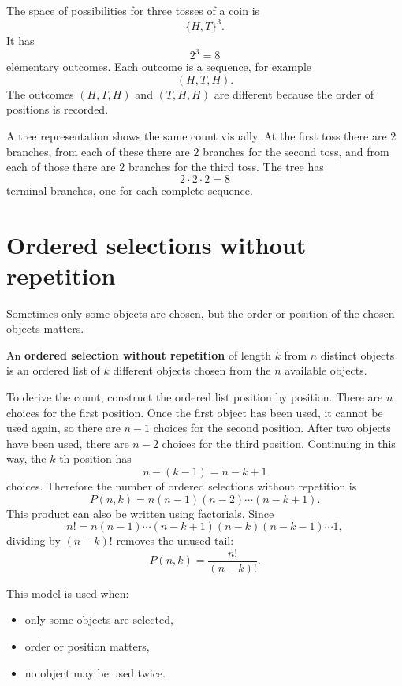\begin{examplebox}
The space of possibilities for three tosses of a coin is
\[
\{H,T\}^3.
\]
It has
\[
2^3=8
\]
elementary outcomes. Each outcome is a sequence, for example
\[
(H,T,H).
\]
The outcomes \((H,T,H)\) and \((T,H,H)\) are different because the order of positions is recorded.

A tree representation shows the same count visually. At the first toss there are \(2\) branches, from each of these there are \(2\) branches for the second toss, and from each of those there are \(2\) branches for the third toss. The tree has
\[
2\cdot 2\cdot 2=8
\]
terminal branches, one for each complete sequence.
\end{examplebox}

\section{Ordered selections without repetition}

Sometimes only some objects are chosen, but the order or position of the chosen objects matters.

\begin{definitionbox}
An \textbf{ordered selection without repetition} of length \(k\) from \(n\) distinct objects is an ordered list of \(k\) different objects chosen from the \(n\) available objects.
\end{definitionbox}

To derive the count, construct the ordered list position by position. There are \(n\) choices for the first position. Once the first object has been used, it cannot be used again, so there are \(n-1\) choices for the second position. After two objects have been used, there are \(n-2\) choices for the third position. Continuing in this way, the \(k\)-th position has
\[
n-(k-1)=n-k+1
\]
choices.
Therefore the number of ordered selections without repetition is
\[
P(n,k)=n(n-1)(n-2)\cdots(n-k+1).
\]
This product can also be written using factorials. Since
\[
n!=n(n-1)\cdots(n-k+1)(n-k)(n-k-1)\cdots 1,
\]
dividing by \((n-k)!\) removes the unused tail:
\[
P(n,k)=\frac{n!}{(n-k)!}.
\]

This model is used when:
\begin{itemize}
    \item only some objects are selected,
    \item order or position matters,
    \item no object may be used twice.
\end{itemize}


